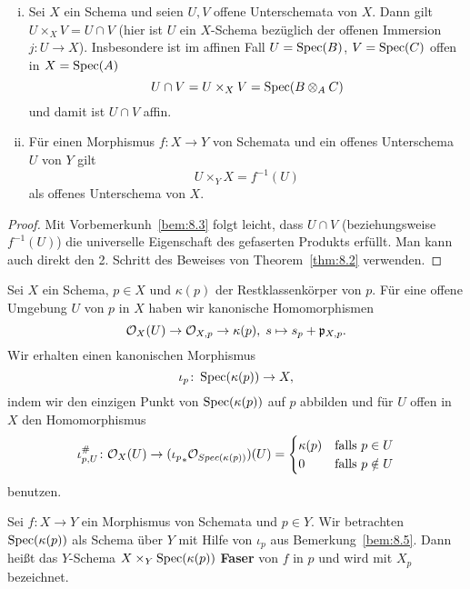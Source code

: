 \begin{bsp}
\label{bsp:8.4}
	\begin{enumerate}[i)]
		\item Sei $X$ ein Schema und seien $U,V$ offene Unterschemata von $X$. Dann gilt $U\times_X V = U \cap V$ (hier ist $U$ ein $X$-Schema bezüglich der offenen Immersion $j\colon U \to X$). Insbesondere ist im affinen Fall $U = \operatorname{Spec}(B)$, $V=\operatorname{Spec}(C)$ offen in $X=\operatorname{Spec}(A)$
		\[
			U \cap V = U\times_X V = \operatorname{Spec}(B \otimes_A C) 	
		\]
		und damit ist $U \cap V$ affin.
		\item Für einen Morphismus $f \colon X \to Y$ von Schemata und ein offenes Unterschema $U$ von $Y$ gilt
		\[
			U \times_Y X = f^{-1}(U)
		\]
		als offenes Unterschema von $X$.
	\end{enumerate}
	\begin{proof}
		Mit Vorbemerkunh~\ref{bem:8.3} folgt leicht, dass $U\cap V$ (beziehungsweise $f^{-1}(U)$) die universelle Eigenschaft des gefaserten Produkts erfüllt. Man kann auch direkt den 2. Schritt des Beweises von Theorem~\ref{thm:8.2} verwenden.
	\end{proof}
\end{bsp}

\begin{bem}
\label{bem:8.5}
	Sei $X$ ein Schema, $p \in X$ und $\kappa(p)$ der Restklassenkörper von $p$. Für eine offene Umgebung $U$ von $p$ in $X$ haben wir kanonische Homomorphismen
	\[
		\mathcal{O}_X(U) \to \mathcal{O}_{X,p} \to \kappa(p), \; s \mapsto s_p + \mathfrak{p}_{X,p}.
	\]
	Wir erhalten einen kanonischen Morphismus
	\[
		\iota_p\colon \operatorname{Spec}(\kappa(p))\to X,
	\]
	indem wir den einzigen Punkt von $\operatorname{Spec}(\kappa(p))$ auf $p$ abbilden und für $U$ offen in $X$ den Homomorphismus
	\[
		\iota_{p,U}^{\#} \colon \mathcal{O}_X(U)\to ({\iota_{p}}_*\mathcal{O}_{Spec(\kappa(p))})(U) = \begin{cases}\kappa(p) & \text{falls } p \in U\\0 & \text{falls } p \notin U\end{cases}
	\]
	benutzen.
\end{bem}

\begin{defn}
\label{defn:8.6}
	Sei $f\colon X \to Y$ ein Morphismus von Schemata und $p \in Y$. Wir betrachten $\operatorname{Spec}(\kappa(p))$ als Schema über $Y$ mit Hilfe von $\iota_p$ aus Bemerkung~\ref{bem:8.5}. Dann heißt das $Y$-Schema $X\times_Y\operatorname{Spec}(\kappa(p))$ \textbf{Faser} von $f$ in $p$ und wird mit $X_p$ bezeichnet.
	\begin{center}
	\end{center}
\end{defn}

